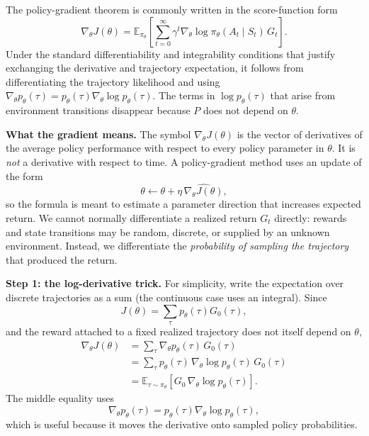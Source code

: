\documentclass[11pt,a4paper]{article}
\theoremstyle{definition}
\begin{document}
The policy-gradient theorem is
commonly written in the score-function form
\label{eq:policy-gradient}
\[
\nabla_\theta J(\theta)
=\mathbb{E}_{\pi_\theta}
\left[\sum_{t=0}^{\infty}
\gamma^t\nabla_\theta\log\pi_\theta(A_t\mid S_t)\,G_t\right].
\]
Under the standard differentiability and integrability conditions that justify exchanging
the derivative and trajectory expectation, it follows from differentiating the trajectory
likelihood and using
$\nabla_\theta p_\theta(\tau)=p_\theta(\tau)\nabla_\theta\log p_\theta(\tau)$.
The terms in $\log p_\theta(\tau)$ that arise from environment transitions disappear
because $P$ does not depend on $\theta$.

\begin{note}
\noindent\textbf{What the gradient means.}
The symbol $\nabla_\theta J(\theta)$ is the vector of derivatives of the average policy
performance with respect to every policy parameter in $\theta$. It is \emph{not} a derivative
with respect to time. A policy-gradient method uses an update of the form
\[
\theta\leftarrow\theta+\eta\,\widehat{\nabla_\theta J(\theta)},
\]
so the formula is meant to estimate a parameter direction that increases expected return. We
cannot normally differentiate a realized return $G_t$ directly: rewards and state transitions
may be random, discrete, or supplied by an unknown environment. Instead, we differentiate the
\emph{probability of sampling the trajectory} that produced the return.

\medskip\noindent\textbf{Step 1: the log-derivative trick.}
For simplicity, write the expectation over discrete trajectories as a sum (the continuous case
uses an integral). Since
\[
J(\theta)=\sum_\tau p_\theta(\tau)G_0(\tau),
\]
and the reward attached to a fixed realized trajectory does not itself depend on $\theta$,
\[
\begin{aligned}
\nabla_\theta J(\theta)
&=\sum_\tau \nabla_\theta p_\theta(\tau)\,G_0(\tau)\\
&=\sum_\tau p_\theta(\tau)\,
\nabla_\theta\log p_\theta(\tau)\,G_0(\tau)\\
&=\mathbb{E}_{\tau\sim\pi_\theta}
\left[G_0\,\nabla_\theta\log p_\theta(\tau)\right].
\end{aligned}
\]
The middle equality uses
\[
\nabla_\theta p_\theta(\tau)
=p_\theta(\tau)\nabla_\theta\log p_\theta(\tau),
\]
which is useful because it moves the derivative onto sampled policy probabilities.


\end{note}
\end{document}
